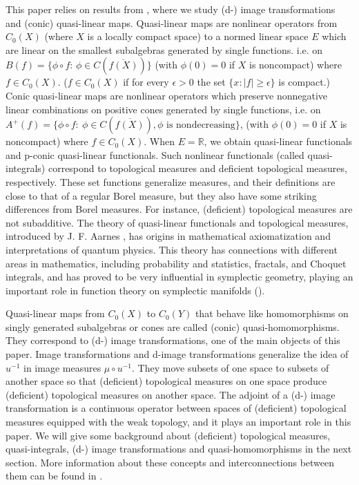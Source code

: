 \documentclass[sn-mathphys-num]{sn-jnl}%
\theoremstyle{thmstyleone}%
\theoremstyle{definition}
\begin{document}
This paper relies on results from \cite{Butler:QLM}, where we study (d-) image transformations and (conic) quasi-linear maps.
Quasi-linear maps are nonlinear operators from $C_0(X)$ (where $X$ is a locally compact space) 
to a normed linear space $E$ which are linear on the smallest subalgebras  generated by single functions. i.e. on 
$B(f) =  \{ \phi \circ f : \,  \phi \in C(\overline{f(X)}) \} $  (with $ \phi(0) = 0 $ if $X$ is noncompact) where $f \in C_0(X)$. 
($f \in C_0(X)$ if for every $\epsilon >0$ the set 
 $\{ x : | f | \ge \epsilon \}$ is compact.)
Conic quasi-linear maps are nonlinear operators which preserve nonnegative linear combinations on positive cones generated by single functions, 
i.e. on $ A^+(f) = \{ \phi \circ f: \ \phi \in C(\overline{f(X)}), \phi  \mbox{   is nondecreasing}\} $, (with $ \phi(0) = 0 $ 
if $X$ is noncompact)  where $f \in C_0(X)$.
When $E = \mathbb R$, we obtain quasi-linear functionals and p-conic quasi-linear functionals. 
Such nonlinear functionals (called quasi-integrals) correspond to topological measures and deficient topological measures, respectively.
These set functions generalize measures, and their definitions are close to that of a regular Borel measure, but they also have
some striking differences from Borel measures. For instance, (deficient) topological measures are not subadditive.  
The theory of quasi-linear functionals and topological measures, introduced by J. F. Aarnes \cite{Aarnes:TheFirstPaper},
has origins in mathematical axiomatization and interpretations of quantum physics. This theory has connections with different areas in mathematics, 
including probability and statistics, fractals, and Choquet integrals,
and has proved to be very influential in symplectic geometry, 
playing an important role in function theory on symplectic manifolds (\cite{PoltRosenBook}). 

Quasi-linear maps  from $C_0(X)$ to $C_0(Y)$ 
that behave like homomorphisms on singly generated subalgebras or cones  are called (conic) quasi-homomorphisms. 
They correspond to (d-) image transformations, one of the main objects of this paper.  
Image transformations and d-image transformations generalize the idea of  $u^{-1}$ in image measures $\mu \circ u^{-1}$. 
They move subsets of one space to subsets of another space so that (deficient) 
topological measures on one space produce (deficient) topological measures on another space.  
The adjoint of a (d-) image transformation is a continuous operator between spaces of (deficient) topological measures 
equipped with the weak topology, and it plays
an important role in this paper. We will give some background about (deficient) topological measures, quasi-integrals, 
(d-) image transformations and quasi-homomorphisms in the next section. 
More information about  these concepts and interconnections between them can be found in \cite{Butler:QLM}. 
\end{document}

